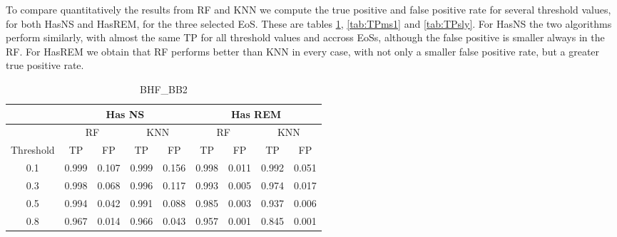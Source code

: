 To compare quantitatively the results from RF and KNN we compute the true positive and false positive rate for several threshold values, for both HasNS and HasREM, for the three selected EoS. These are tables \ref{tab:TPbhf}, \ref{tab:TPms1} and \ref{tab:TPsly}. For HasNS the two algorithms perform similarly, with almost the same TP for all threshold values and accross EoSs, although the false positive is smaller always in the RF. For HasREM we obtain that RF performs better than KNN in every case, with not only a smaller false positive rate, but a greater true positive rate.

\begin{table}[]
\centering
\begin{tabular}{@{}c|cccc|cccc@{}}
\toprule
\multicolumn{1}{l|}{}          & \multicolumn{4}{c|}{Has NS}                       & \multicolumn{4}{c}{Has REM}                      \\ \midrule
                               & \multicolumn{2}{c}{RF} & \multicolumn{2}{c|}{KNN} & \multicolumn{2}{c}{RF} & \multicolumn{2}{c}{KNN} \\
\multicolumn{1}{l|}{Threshold} & TP         & FP        & TP          & FP         & TP         & FP        & TP         & FP         \\ \midrule
0.1                            & 0.999      & 0.107     &   0.999          &  0.156          & 0.998      & 0.011     &    0.992        &  0.051          \\
0.3                            & 0.998      & 0.068     &   0.996        &  0.117          & 0.993      & 0.005     &   0.974         &  0.017          \\
0.5                            & 0.994      & 0.042     &   0.991          &  0.088           & 0.985      & 0.003     &   0.937         &  0.006          \\
0.8                            & 0.967      & 0.014     &   0.966          & 0.043            & 0.957      & 0.001     &  0.845          &   0.001         \\ \bottomrule
\end{tabular}
\caption{BHF\_BB2}
\label{tab:TPbhf}
\end{table}



